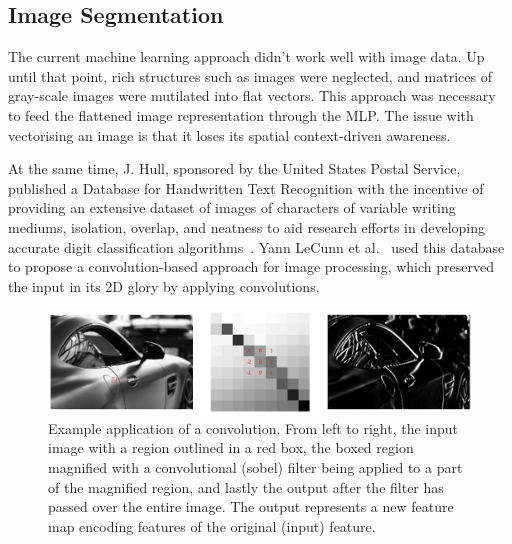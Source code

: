 \documentclass[12pt,twoside]{report}
\begin{document}
\subsection{Image Segmentation}\label{sect:image-segmentation}

The current machine learning approach didn't work well with image data. Up until that point, rich structures such as images were neglected, and matrices of gray-scale images were mutilated into flat vectors. This approach was necessary to feed the flattened image representation through the MLP. The issue with vectorising an image is that it loses its spatial context-driven awareness. 

At the same time, J. Hull, sponsored by the United States Postal Service, published a Database for Handwritten Text Recognition with the incentive of providing an extensive dataset of images of characters of variable writing mediums, isolation, overlap, and neatness to aid research efforts in developing accurate digit classification algorithms~\cite{JJHull1994}. Yann LeCunn et al.~\cite{Lenet1998} used this database to propose a convolution-based approach for image processing, which preserved the input in its 2D glory by applying convolutions.

\begin{figure}[H]
  \centering
  \includegraphics[width=1\linewidth]{../figures/sobel.png}
  \caption{Example application of a convolution. From left to right, the input image with a region outlined in a red box, the boxed region magnified with a convolutional (sobel) filter being applied to a part of the magnified region, and lastly the output after the filter has passed over the entire image. The output represents a new feature map encoding features of the original (input) feature.}\label{fig:sobel}
\end{figure}
\end{document}
